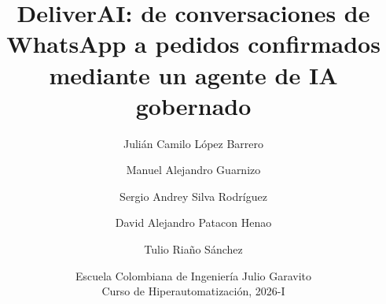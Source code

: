 
\title{DeliverAI: de conversaciones de WhatsApp a pedidos confirmados mediante un agente de IA gobernado}
\author{Julián Camilo López Barrero \and Manuel Alejandro Guarnizo \and Sergio Andrey Silva Rodríguez \and David Alejandro Patacon Henao \and Tulio Riaño Sánchez}
\date{Escuela Colombiana de Ingeniería Julio Garavito\\Curso de Hiperautomatización, 2026-I}
